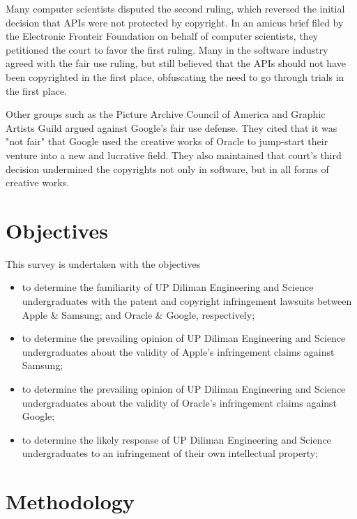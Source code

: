 \documentclass[prodmode,cs196]{acmlarge}
\begin{document}
Many computer scientists disputed the second ruling, which reversed the initial decision that APIs were not protected by copyright. In an amicus brief filed by the Electronic Fronteir Foundation on behalf of computer scientists, they petitioned the court to favor the first ruling. Many in the software industry agreed with the fair use ruling, but still believed that the APIs should not have been copyrighted in the first place, obfuscating the need to go through trials in the first place. \cite{EFFAmicusBrief}

Other groups such as the Picture Archive Council of America and Graphic Artists Guild argued against Google's fair use defense. They cited that it was "not fair" that Google used the creative works of Oracle to jump-start their venture into a new and lucrative field. They also maintained that court's third decision undermined the copyrights not only in software, but in all forms of creative works. \cite{ProOracleAmicusBrief}

\section{Objectives}

This survey is undertaken with the objectives

\begin{itemize}
	\item{to determine the familiarity of UP Diliman Engineering and Science undergraduates with the patent and copyright infringement lawsuits between Apple \& Samsung; and Oracle \& Google, respectively;}
	\item{to determine the prevailing opinion of UP Diliman Engineering and Science undergraduates about the validity of Apple's infringement claims against Samsung;}
	\item{to determine the prevailing opinion of UP Diliman Engineering and Science undergraduates about the validity of Oracle's infringement claims against Google;}
	\item{to determine the likely response of UP Diliman Engineering and Science undergraduates to an infringement of their own intellectual property;}
\end{itemize}

\section{Methodology}
\end{document}
